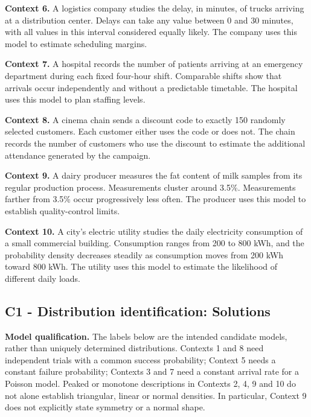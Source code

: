 {		\textbf{Context 6.} A logistics company studies the delay, in minutes,
		of trucks arriving at a distribution center. Delays can take any value
		between 0 and 30 minutes, with all values in this interval considered
		equally likely. The company uses this model to estimate scheduling
		margins.
		
		\textbf{Context 7.} A hospital records the number of patients arriving
		at an emergency department during each fixed four-hour shift.
		Comparable shifts show that arrivals occur independently and without
		a predictable timetable. The hospital uses this model to plan staffing
		levels.
		
		\textbf{Context 8.} A cinema chain sends a discount code to exactly
		150 randomly selected customers. Each customer either uses the code
		or does not. The chain records the number of customers who use the
		discount to estimate the additional attendance generated by the campaign.
		
		\textbf{Context 9.} A dairy producer measures the fat content of milk
		samples from its regular production process. Measurements cluster around
		3.5\%.
		Measurements farther from 3.5\% occur progressively less often. The
		producer uses this model to establish quality-control limits.
		


		\textbf{Context 10.} A city's electric utility studies the daily
		electricity consumption of a small commercial building. Consumption
		ranges from 200 to 800 kWh, and the probability density decreases
		steadily as consumption moves from 200 kWh toward 800 kWh. The utility
		uses this model to estimate the likelihood of different daily loads.
		
		\label{subsec:identifying-probability-distributions-c1-solution}
		\label{subsec:identifying-probability-distributions-c1-characterization}
		\subsection*{C1 - Distribution identification: Solutions }

		\textbf{Model qualification.} The labels below are the intended candidate
        models, rather than uniquely determined distributions. Contexts 1 and 8
        need independent trials with a common success probability; Context 5
        needs a constant failure probability; Contexts 3 and 7 need a constant
        arrival rate for a Poisson model. Peaked or monotone descriptions in
        Contexts 2, 4, 9 and 10 do not alone establish triangular, linear or
        normal densities. In particular, Context 9 does not explicitly state
        symmetry or a normal shape.
		
}
